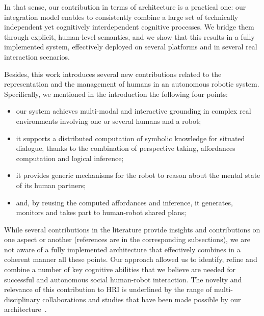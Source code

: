 \documentclass[preprint,3p,times]{elsarticle}
\begin{document}
In that sense, our contribution in terms of architecture is a practical one:
our integration model enables to consistently combine a large set of
technically independent yet cognitively interdependent cognitive processes. We
bridge them through explicit, human-level semantics, and we show that this
results in a fully implemented system, effectively deployed on several
platforms and in several real interaction scenarios.

Besides, this work introduces several new contributions related to the
representation and the management of humans in an autonomous robotic system.
Specifically, we mentioned in the introduction the following four points:

\begin{itemize}

	\item our system achieves multi-modal and interactive grounding in complex
		real environments involving one or several humans and a robot;

	\item it supports a distributed computation of symbolic knowledge for
		situated dialogue, thanks to the combination of perspective taking,
		affordances computation and logical inference;

	\item it provides generic mechanisms for the robot to reason about the mental state
		of its human partners;

	\item and, by reusing the computed affordances and inference, it generates,
		monitors and takes part to human-robot shared plans;

\end{itemize}

While several contributions in the literature provide insights and
contributions on one aspect or another (references are in the corresponding
subsections), we are not aware of a fully implemented architecture that
effectively combines in a coherent manner all these points. Our approach
allowed us to identify, refine and combine a number of key cognitive abilities
that we believe are needed for successful and autonomous social human-robot
interaction. The novelty and relevance of this contribution to HRI is
underlined by the range of multi-disciplinary collaborations and studies that
have been made possible by our
architecture~\cite{dautenhahn2006may,koay2007exploratory,Ros2010b,dehais2011physiological,ferreira2015users,GharbiROMAN2015}.
\end{document}
